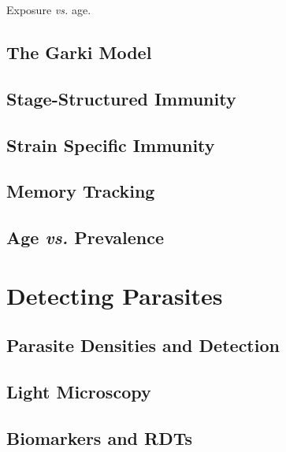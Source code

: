 \documentclass[
]{book}
\begin{document}
Exposure \emph{vs.} age.

\hypertarget{the-garki-model}{%
\section{The Garki Model}\label{the-garki-model}}

\hypertarget{stage-structured-immunity}{%
\section{Stage-Structured Immunity}\label{stage-structured-immunity}}

\hypertarget{strain-specific-immunity}{%
\section{Strain Specific Immunity}\label{strain-specific-immunity}}

\hypertarget{memory-tracking}{%
\section{Memory Tracking}\label{memory-tracking}}

\hypertarget{age-vs.-prevalence}{%
\section{\texorpdfstring{Age \emph{vs.} Prevalence}{Age vs. Prevalence}}\label{age-vs.-prevalence}}

\hypertarget{detecting-parasites}{%
\chapter{Detecting Parasites}\label{detecting-parasites}}

\hypertarget{parasite-densities-and-detection}{%
\section{Parasite Densities and Detection}\label{parasite-densities-and-detection}}

\hypertarget{light-microscopy}{%
\section{Light Microscopy}\label{light-microscopy}}

\hypertarget{biomarkers-and-rdts}{%
\section{Biomarkers and RDTs}\label{biomarkers-and-rdts}}
\end{document}
